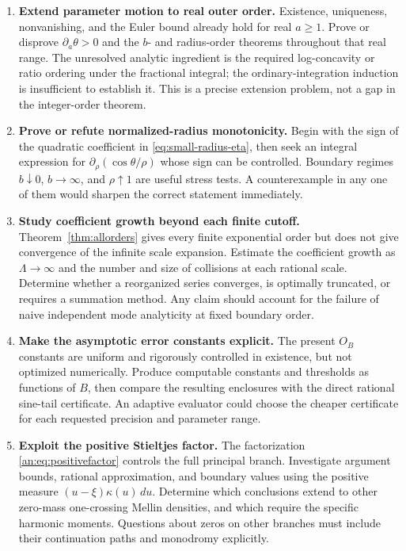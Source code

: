 \documentclass[11pt]{article}
\numberwithin{equation}{section}
\theoremstyle{plain}
\theoremstyle{definition}
\theoremstyle{remark}
\begin{document}
\begin{enumerate}[leftmargin=*,itemsep=5pt,start=7]
\item \textbf{Extend parameter motion to real outer order.}
Existence, uniqueness, nonvanishing, and the Euler bound already hold
for real $a\ge1$. Prove or disprove $\partial_a\theta>0$ and the
$b$- and radius-order theorems throughout that real range.
The unresolved analytic ingredient is the required log-concavity or
ratio ordering under the fractional integral; the ordinary-integration
induction is insufficient to establish it. This is a precise extension
problem, not a gap in the integer-order theorem.

\item \textbf{Prove or refute normalized-radius monotonicity.}
Begin with the sign of the quadratic coefficient in
\eqref{eq:small-radius-eta}, then seek an integral expression for
$\partial_\rho(\cos\theta/\rho)$ whose sign can be controlled.
Boundary regimes $b\downarrow0$, $b\to\infty$, and $\rho\uparrow1$
are useful stress tests. A counterexample in any one of them would
sharpen the correct statement immediately.

\item \textbf{Study coefficient growth beyond each finite cutoff.}
Theorem~\ref{thm:allorders} gives every finite exponential order but
does not give convergence of the infinite scale expansion. Estimate
the coefficient growth as $\Lambda\to\infty$ and the number and size
of collisions at each rational scale. Determine whether a reorganized
series converges, is optimally truncated, or requires a summation
method. Any claim should account for the failure of naive independent
mode analyticity at fixed boundary order.

\item \textbf{Make the asymptotic error constants explicit.}
The present $O_B$ constants are uniform and rigorously controlled in
existence, but not optimized numerically. Produce computable constants
and thresholds as functions of $B$, then compare the resulting
enclosures with the direct rational sine-tail certificate.
An adaptive evaluator could choose the cheaper certificate for each
requested precision and parameter range.

\item \textbf{Exploit the positive Stieltjes factor.}
The factorization \eqref{an:eq:positivefactor} controls the full
principal branch. Investigate argument bounds, rational approximation,
and boundary values using the positive measure
$(u-\xi)\kappa(u)\,du$. Determine which conclusions extend to other
zero-mass one-crossing Mellin densities, and which require the specific
harmonic moments. Questions about zeros on other branches must include
their continuation paths and monodromy explicitly.


\end{enumerate}
\end{document}
